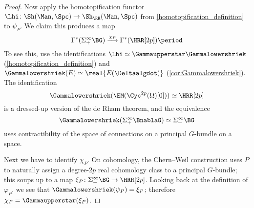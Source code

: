 \begin{proof}
	Now apply the homotopification functor $\Lhi\colon\Sh(\Man, \Spc)\to\Sh_\RR(\Man, \Spc)$ from
	\cref{homotopification_definition} to $\psi_P$. We claim this produces a map
	\begin{equation}
		\Gamma^*(\Sigma_+^\infty\BG)\overset{\chi_P}{\longrightarrow} \Gamma^*(\HRR[2p])\period
	\end{equation}
	To see this, use the identifications $\Lhi\simeq\Gammaupperstar\Gammalowershriek$
	(\cref{homotopification_definition}) and $\Gammalowershriek(E)\simeq \real{E(\Deltaalgdot)}$
	(\cref{cor:Gammalowershriek}). The identification
	\begin{equation*}
		\Gammalowershriek(\EM(\Cyc^{2p}(\Omega)[0]))\simeq \HRR[2p]
	\end{equation*}
	is a dressed-up version of the de Rham theorem, and the equivalence
	\begin{equation*}
		\Gammalowershriek(\Sigma_+^\infty\BnablaG) \simeq \Sigma_+^\infty\BG
	\end{equation*}
	uses contractibility of the space of connections on a principal $G$-bundle on a space.

	Next we have to identify $\chi_P$. On cohomology, the Chern--Weil construction uses $P$ to naturally assign a
	degree-$2p$ real cohomology class to a principal $G$-bundle; this soups up to a map
	$\xi_P\colon\Sigma_+^\infty\BG\to \HRR[2p]$. Looking back at the definition of $\varphi_P$, we see that
	$\Gammalowershriek(\psi_P) = \xi_P$; therefore $\chi_P = \Gammaupperstar(\xi_P)$.


\end{proof}

